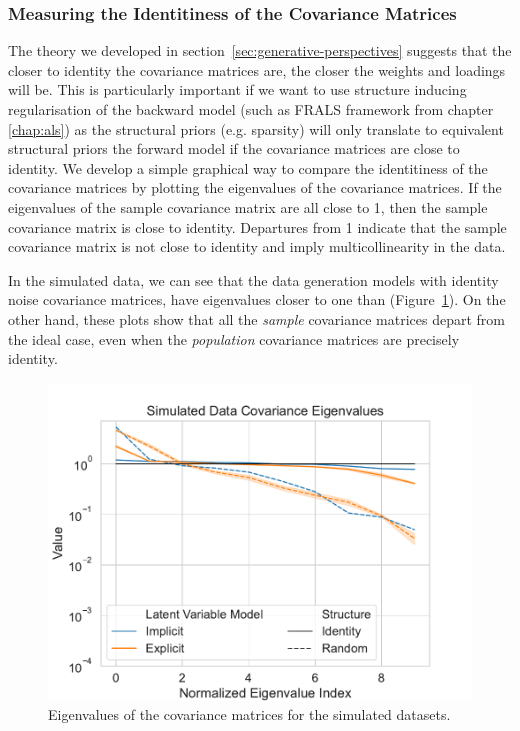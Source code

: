 \subsubsection{Measuring the Identitiness of the Covariance Matrices}
The theory we developed in section~\ref{sec:generative-perspectives} suggests that the closer to identity the covariance matrices are, the closer the weights and \gls{loadings} will be.
This is particularly important if we want to use structure inducing regularisation of the backward model (such as FRALS framework from chapter \ref{chap:als}) as the structural priors (e.g. sparsity) will only translate to equivalent structural priors the forward model if the covariance matrices are close to identity.
We develop a simple graphical way to compare the identitiness of the covariance matrices by plotting the eigenvalues of the covariance matrices.
If the eigenvalues of the sample covariance matrix are all close to 1, then the sample covariance matrix is close to identity.
Departures from 1 indicate that the sample covariance matrix is not close to identity and imply multicollinearity in the data.

In the simulated data, we can see that the data generation models with identity noise covariance matrices, have eigenvalues closer to one than (Figure~\ref{fig:covariance-eigenvalues-simulated-low}).
On the other hand, these plots show that all the \textit{sample} covariance matrices depart from the ideal case, even when the \textit{population} covariance matrices are precisely identity.

\begin{figure}
    \centering
    \includegraphics[width=0.8\linewidth]{figures/covariance/simulated_covariance_eigenvalues_low}
    \caption{Eigenvalues of the covariance matrices for the simulated datasets.}\label{fig:covariance-eigenvalues-simulated-low}
\end{figure}


